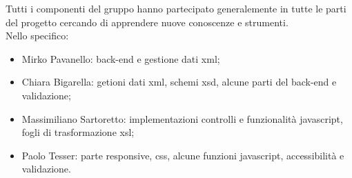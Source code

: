 Tutti i componenti del gruppo hanno partecipato generalemente in tutte le parti del progetto cercando di apprendere nuove conoscenze e strumenti. \\
Nello specifico:
\begin{itemize}
	\item Mirko Pavanello: back-end e gestione dati xml; 
	\item Chiara Bigarella: getioni dati xml, schemi xsd, alcune parti del back-end e validazione;
	\item Massimiliano Sartoretto: implementazioni controlli e funzionalit\`a javascript, fogli di trasformazione xsl;
	\item Paolo Tesser: parte responsive, css, alcune funzioni javascript, accessibilit\`a e validazione.
\end{itemize}